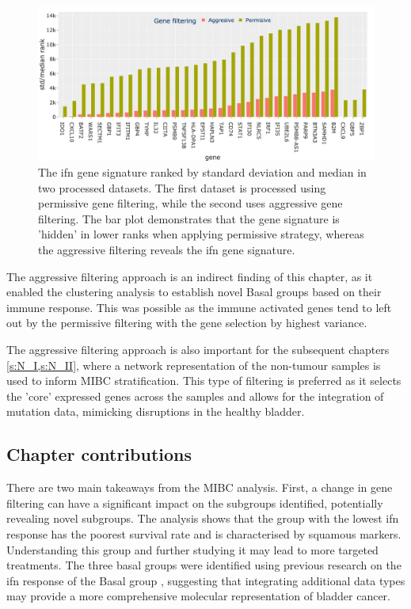 \begin{figure}[!htb]
    \centering
    \includegraphics[width=1.0\textwidth,keepaspectratio]{Sections/Gene_Sel/ifng_ranks.png}
    \caption[Std/median ranks of the genes in \acrlong{ifn} signature]{The \acrshort{ifn} gene signature \citep{Baker2022-bj} ranked by standard deviation and median in two processed datasets. The first dataset is processed using permissive gene filtering, while the second uses aggressive gene filtering. The bar plot demonstrates that the gene signature is 'hidden' in lower ranks when applying permissive strategy, whereas the aggressive filtering reveals the \acrshort{ifn} gene signature.}
      \label{fig:ifng_rank_genes}
\end{figure}


The aggressive filtering approach is an indirect finding of this chapter, as it enabled the clustering analysis to establish novel Basal groups based on their immune response. This was possible as the immune activated genes tend to left out by the permissive filtering with the gene selection by highest variance. 

The aggressive filtering approach is also important for the subsequent chapters \cref{s:N_I,s:N_II}, where a network representation of the non-tumour samples is used to inform MIBC stratification. This type of filtering is preferred as it selects the 'core' expressed genes across the samples and allows for the integration of mutation data, mimicking disruptions in the healthy bladder.

\subsection{Chapter contributions}

There are two main takeaways from the MIBC analysis. First, a change in gene filtering can have a significant impact on the subgroups identified, potentially revealing novel subgroups. The analysis shows that the group with the lowest \acrfull{ifn} response has the poorest survival rate and is characterised by squamous markers. Understanding this group and further studying it may lead to more targeted treatments. The three basal groups were identified using previous research on the \acrshort{ifn} response of the Basal group \citep{Marzouka2018-ge,Baker2022-bj}, suggesting that integrating additional data types may provide a more comprehensive molecular representation of bladder cancer.


